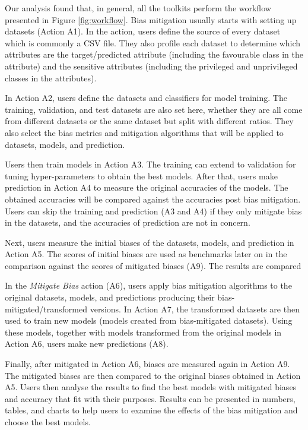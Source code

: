 \documentclass[sigconf,review]{acmart}
\begin{document}
Our analysis found that, in general, all the toolkits perform the workflow presented in Figure \ref{fig:workflow}. Bias mitigation usually starts with setting up datasets (Action A1). In the action, users define the source of every dataset which is commonly a CSV file. They also profile each dataset to determine which attributes are the target/predicted attribute (including the favourable class in the attribute) and the sensitive attributes (including the privileged and unprivileged classes in the attributes).

In Action A2, users define the datasets and classifiers for model training. The training, validation, and test datasets are also set here, whether they are all come from different datasets or the same dataset but split with different ratios. They also select the bias metrics and mitigation algorithms that will be applied to datasets, models, and prediction. 

Users then train models in Action A3. The training can extend to validation for tuning hyper-parameters to obtain the best models. After that, users make prediction in Action A4 to measure the original accuracies of the models. The obtained accuracies will be compared against the accuracies post bias mitigation.
Users can skip the training and prediction (A3 and A4) if they only mitigate bias in the datasets, and the accuracies of prediction are not in concern.

Next, users measure the initial biases of the datasets, models, and prediction in Action A5. The scores of initial biases are used as benchmarks later on in the comparison against the scores of mitigated biases (A9). The results are compared

In the \textit{Mitigate Bias} action (A6), users apply bias mitigation algorithms to the original datasets, models, and predictions producing their bias-mitigated/transformed versions. In Action A7, the transformed datasets are then used to train new models (models created from bias-mitigated datasets). Using these models, together with models transformed from the original models in Action A6, users make new predictions (A8). 

Finally, after mitigated in Action A6, biases are measured again in Action A9. The mitigated biases are then compared to the original biases obtained in Action A5.  Users then analyse the results to find the best models with mitigated biases and accuracy that fit with their purposes. Results can be presented in numbers, tables, and charts to help users to examine the effects of the bias mitigation and choose the best models. 
\end{document}

